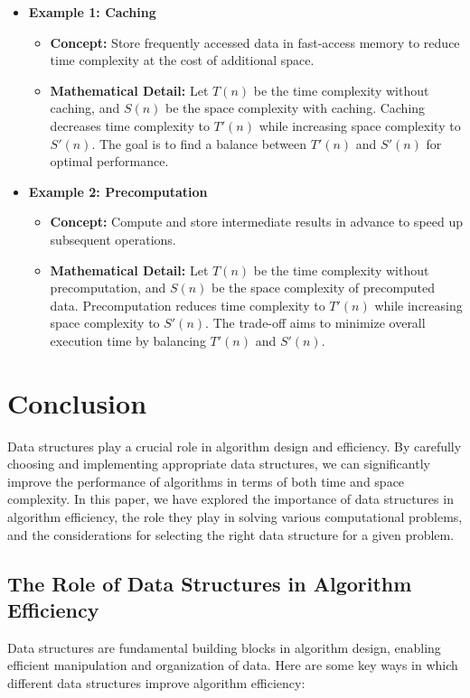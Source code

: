 \documentclass[12pt]{book} %
\begin{document}
\begin{itemize}
    \item \textbf{Example 1: Caching} 
    \begin{itemize}
        \item \textbf{Concept:} Store frequently accessed data in fast-access memory to reduce time complexity at the cost of additional space.
        \item \textbf{Mathematical Detail:} Let \(T(n)\) be the time complexity without caching, and \(S(n)\) be the space complexity with caching. Caching decreases time complexity to \(T'(n)\) while increasing space complexity to \(S'(n)\). The goal is to find a balance between \(T'(n)\) and \(S'(n)\) for optimal performance.
    \end{itemize}
    \item \textbf{Example 2: Precomputation}
    \begin{itemize}
        \item \textbf{Concept:} Compute and store intermediate results in advance to speed up subsequent operations.
        \item \textbf{Mathematical Detail:} Let \(T(n)\) be the time complexity without precomputation, and \(S(n)\) be the space complexity of precomputed data. Precomputation reduces time complexity to \(T'(n)\) while increasing space complexity to \(S'(n)\). The trade-off aims to minimize overall execution time by balancing \(T'(n)\) and \(S'(n)\).
    \end{itemize}
\end{itemize}


\section{Conclusion}

Data structures play a crucial role in algorithm design and efficiency. By carefully choosing and implementing appropriate data structures, we can significantly improve the performance of algorithms in terms of both time and space complexity. In this paper, we have explored the importance of data structures in algorithm efficiency, the role they play in solving various computational problems, and the considerations for selecting the right data structure for a given problem.

\subsection{The Role of Data Structures in Algorithm Efficiency}
Data structures are fundamental building blocks in algorithm design, enabling efficient manipulation and organization of data. Here are some key ways in which different data structures improve algorithm efficiency:
\end{document}
